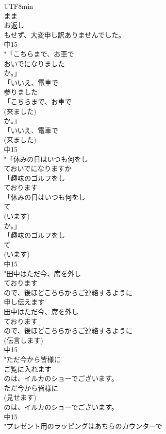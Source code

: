 \documentclass[8pt]{extreport}
\begin{document}
\begin{CJK}{UTF8}{min}
\\	まま
\\	お返し
\\	もせず、大変申し訳ありませんでした。
\\	中15
\\	"「こちらまで、お車で
\\	おいでになりました
\\	か。」
\\	「いいえ、電車で
\\	参りました
\\	「こちらまで、お車で
\\	(来ました)
\\	か。」
\\	「いいえ、電車で
\\	(来ました)
\\	中15
\\	"「休みの日はいつも何をし
\\	ておいでになりますか
\\	「趣味のゴルフをし
\\	ております
\\	「休みの日はいつも何をし
\\	て
\\	(います)
\\	か。」
\\	「趣味のゴルフをし
\\	て
\\	(います)
\\	中15
\\	"田中はただ今、席を外し
\\	ております
\\	ので、後ほどこちらからご連絡するように
\\	申し伝えます
\\	田中はただ今、席を外し
\\	ております
\\	ので、後ほどこちらからご連絡するように
\\	(伝言します)
\\	中15
\\	"ただ今から皆様に
\\	ご覧に入れます
\\	のは、イルカのショーでございます。
\\	ただ今から皆様に
\\	(見せます)
\\	のは、イルカのショーでございます。
\\	中15
\\	"プレゼント用のラッピングはあちらのカウンターで

\end{CJK}
\end{document}
